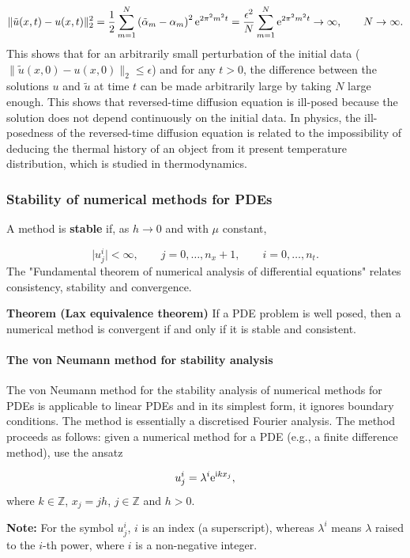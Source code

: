 \documentclass[12pt,landscape]{article}
\begin{document}
{\[
\|\tilde{u}(x,t) - u(x,t)\|_2^2 =  \frac{1}{2}\sum_{m=1}^{N} \left(\tilde{\alpha}_m - \alpha_m\right)^2 {\rm e}^{2\pi^2 m^2 t} = \frac{\epsilon^2}{N}\sum_{m=1}^{N} {\rm e}^{2\pi^2 m^2 t} \to \infty, \qquad N\to \infty.
\]
This shows that for an arbitrarily small perturbation of the initial data ($\|\tilde{u}(x,0) - u(x,0)\|_2 \leq \epsilon$) and for any $t > 0$, the difference between the solutions $u$ and $\tilde{u}$ at time $t$ can be made arbitrarily large by taking $N$ large enough. This shows that reversed-time diffusion equation is ill-posed because the solution does not depend continuously on the initial data.  In physics, the ill-posedness of the reversed-time diffusion equation is related to the impossibility of deducing the thermal history of an object from it present temperature distribution, which is studied in thermodynamics.

\subsubsection{Stability of numerical methods for PDEs}
A method is \textbf{stable} if, as $h \to 0$ and with $\mu$ constant,

\[
\vert u^i_j \vert < \infty, \qquad    j = 0, \ldots, n_x+1, \qquad i = 0, \ldots, n_t.
\]
The "Fundamental theorem of numerical analysis of differential equations" relates consistency, stability and convergence.

\textbf{Theorem (Lax equivalence theorem)} If a PDE problem is well posed, then a numerical method is convergent if and only if it is stable and consistent.

\paragraph{The von Neumann method for stability analysis}
The von Neumann method for the stability analysis of numerical methods for PDEs is applicable to linear PDEs and in its simplest form, it ignores boundary conditions. The method is essentially a discretised Fourier analysis.  The method proceeds as follows: given a numerical method for a PDE (e.g., a finite difference method), use the ansatz

\[
u^i_j = \lambda^i {\rm e}^{{\rm i}k x_j},
\]
where $k \in \mathbb{Z}$, $x_j = j h$, $j \in \mathbb{Z}$ and $h > 0$. 

\textbf{Note:} For the symbol $u^i_j$, $i$ is an index (a superscript), whereas $\lambda^i$ means $\lambda$ raised to the $i$-th power, where $i$ is a non-negative integer.  

}
\end{document}
